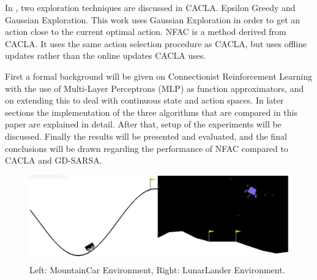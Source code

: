 In \cite{van2007reinforcement}, two exploration techniques are discussed in CACLA. Epsilon Greedy and Gaussian Exploration. This work uses Gaussian Exploration in order to get an action close to the current optimal action. NFAC \cite{zimmer2016neural} is a method derived from CACLA. It uses the same action selection procedure as CACLA, but uses offline updates rather than the online updates CACLA uses. 



First a formal background will be given on Connectionist Reinforcement Learning with the use of Multi-Layer Perceptrons (MLP) as function approximators, and on extending this to deal with continuous state and action spaces. In later sections the implementation of the three algorithms that are compared in this paper are explained in detail. After that, setup of the experiments will be discussed. Finally the results will be presented and evaluated, and the final conclusions will be drawn regarding the performance of NFAC compared to CACLA and GD-SARSA.

\begin{figure}[t]
 \centering 
    \includegraphics[width = 0.7\columnwidth]{figs/mountainlunar.png}
 \caption{Left: MountainCar Environment, Right: LunarLander Environment.}
\label{fig:mountainlunar}
\end{figure}
